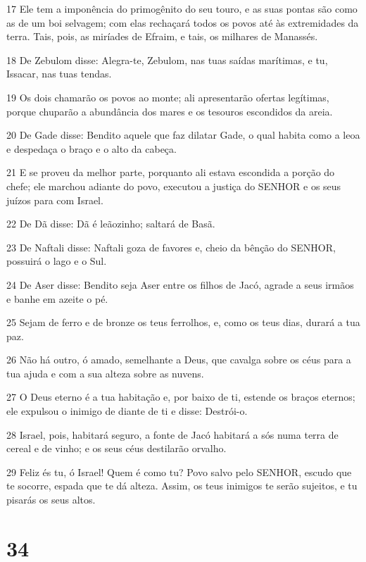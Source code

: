 \par 17 Ele tem a imponência do primogênito do seu touro, e as suas pontas são como as de um boi selvagem; com elas rechaçará todos os povos até às extremidades da terra. Tais, pois, as miríades de Efraim, e tais, os milhares de Manassés.
\par 18 De Zebulom disse: Alegra-te, Zebulom, nas tuas saídas marítimas, e tu, Issacar, nas tuas tendas.
\par 19 Os dois chamarão os povos ao monte; ali apresentarão ofertas legítimas, porque chuparão a abundância dos mares e os tesouros escondidos da areia.
\par 20 De Gade disse: Bendito aquele que faz dilatar Gade, o qual habita como a leoa e despedaça o braço e o alto da cabeça.
\par 21 E se proveu da melhor parte, porquanto ali estava escondida a porção do chefe; ele marchou adiante do povo, executou a justiça do SENHOR e os seus juízos para com Israel.
\par 22 De Dã disse: Dã é leãozinho; saltará de Basã.
\par 23 De Naftali disse: Naftali goza de favores e, cheio da bênção do SENHOR, possuirá o lago e o Sul.
\par 24 De Aser disse: Bendito seja Aser entre os filhos de Jacó, agrade a seus irmãos e banhe em azeite o pé.
\par 25 Sejam de ferro e de bronze os teus ferrolhos, e, como os teus dias, durará a tua paz.
\par 26 Não há outro, ó amado, semelhante a Deus, que cavalga sobre os céus para a tua ajuda e com a sua alteza sobre as nuvens.
\par 27 O Deus eterno é a tua habitação e, por baixo de ti, estende os braços eternos; ele expulsou o inimigo de diante de ti e disse: Destrói-o.
\par 28 Israel, pois, habitará seguro, a fonte de Jacó habitará a sós numa terra de cereal e de vinho; e os seus céus destilarão orvalho.
\par 29 Feliz és tu, ó Israel! Quem é como tu? Povo salvo pelo SENHOR, escudo que te socorre, espada que te dá alteza. Assim, os teus inimigos te serão sujeitos, e tu pisarás os seus altos.

\chapter{34}

